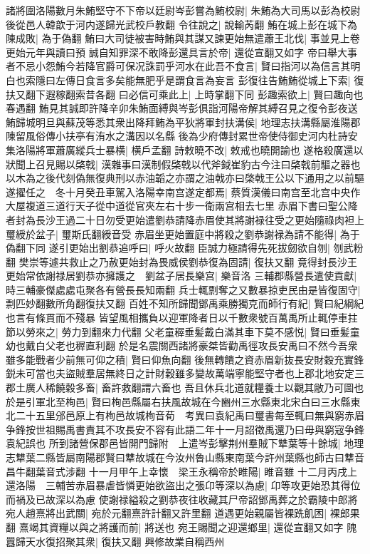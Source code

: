 諸將圍洛陽數月朱鮪堅守不下帝以廷尉岑彭嘗為鮪校尉|{
	朱鮪為大司馬以彭為校尉後從邑人韓歆于河内遂歸光武校戶教翻}
令往說之|{
	說輸芮翻}
鮪在城上彭在城下為陳成敗|{
	為于偽翻}
鮪曰大司徒被害時鮪與其謀又諫更始無遣蕭王北伐|{
	事並見上卷更始元年與讀曰預}
誠自知罪深不敢降彭還具言於帝|{
	還從宣翻又如字}
帝曰舉大事者不忌小怨鮪今若降官爵可保况誅罰乎河水在此吾不食言|{
	賢曰指河以為信言其明白也索隱曰左傳日食言多矣能無肥乎是謂食言為妄言}
彭復往告鮪鮪從城上下索|{
	復扶又翻下遐稼翻索昔各翻}
曰必信可乘此上|{
	上時掌翻下同}
彭趣索欲上|{
	賢曰趣向也春遇翻}
鮪見其誠即許降辛卯朱鮪面縛與岑彭俱詣河陽帝解其縛召見之復令彭夜送鮪歸城明旦與蘇茂等悉其衆出降拜鮪為平狄將軍封扶溝侯|{
	地理志扶溝縣屬淮陽郡陳留風俗傳小扶亭有洧水之溝因以名縣}
後為少府傳封累世帝使侍御史河内杜詩安集洛陽將軍蕭廣縱兵士暴横|{
	横戶孟翻}
詩敕曉不改|{
	敕戒也曉開諭也}
遂格殺廣還以狀聞上召見賜以棨戟|{
	漢雜事曰漢制假棨戟以代斧鉞崔豹古今注曰棨戟前驅之器也以木為之後代刻偽無復典刑以赤油韜之亦謂之油戟亦曰棨戟王公以下通用之以前驅}
遂擢任之　冬十月癸丑車駕入洛陽幸南宫遂定都焉|{
	蔡質漢儀曰南宫至北宫中央作大屋複道三道行天子從中道從官夾左右十步一衛兩宫相去七里}
赤眉下書曰聖公降者封為長沙王過二十日勿受更始遣劉恭請降赤眉使其將謝禄往受之更始隨祿肉袒上璽綬於盆子|{
	璽斯氏翻綬音受}
赤眉坐更始置庭中將殺之劉恭謝禄為請不能得|{
	為于偽翻下同}
遂引更始出劉恭追呼曰|{
	呼火故翻}
臣誠力極請得先死拔劒欲自刎|{
	刎武粉翻}
樊崇等遽共救止之乃赦更始封為畏威侯劉恭復為固請|{
	復扶又翻}
竟得封長沙王更始常依謝禄居劉恭亦擁護之　劉盆子居長樂宫|{
	樂音洛}
三輔郡縣營長遣使貢獻|{
	時三輔豪傑處處屯聚各有營長長知兩翻}
兵士輒剽奪之又數暴掠吏民由是皆復固守|{
	剽匹妙翻數所角翻復扶又翻}
百姓不知所歸聞鄧禹乘勝獨克而師行有紀|{
	賢曰紀綱紀也言有條貫而不殘暴}
皆望風相攜負以迎軍降者日以千數衆號百萬禹所止輒停車拄節以勞來之|{
	勞力到翻來力代翻}
父老童稺垂髪戴白滿其車下莫不感悦|{
	賢曰垂髪童幼也戴白父老也稺直利翻}
於是名震關西諸將豪桀皆勸禹徑攻長安禹曰不然今吾衆雖多能戰者少前無可仰之積|{
	賢曰仰魚向翻}
後無轉饋之資赤眉新抜長安財穀充實鋒鋭未可當也夫盜賊羣居無終日之計財穀雖多變故萬端寧能堅守者也上郡北地安定三郡土廣人稀饒穀多畜|{
	畜許救翻謂六畜也}
吾且休兵北道就糧養士以觀其敝乃可圖也於是引軍北至栒邑|{
	賢曰栒邑縣屬右扶風故城在今豳州三水縣東北宋白曰三水縣東北二十五里邠邑原上有栒邑故城栒音荀　考異曰袁紀禹曰璽書每至輒曰無與窮赤眉争鋒按世祖賜禹書責其不攻長安不容有此語二年十一月詔徵禹還乃曰毋與窮宼争鋒袁紀誤也}
所到諸營保郡邑皆開門歸附　上遣岑彭擊荆州羣賊下犨葉等十餘城|{
	地理志犨葉二縣皆屬南陽郡賢曰犨故城在今汝州魯山縣東南葉今許州葉縣也師古曰犨音昌牛翻葉音式涉翻}
十一月甲午上幸懷　梁王永稱帝於睢陽|{
	睢音雖}
十二月丙戌上還洛陽　三輔苦赤眉暴虐皆憐更始欲盜出之張卬等深以為慮|{
	卬等攻更始恐其得位而禍及已故深以為慮}
使謝禄縊殺之劉恭夜往收藏其尸帝詔鄧禹葬之於霸陵中郎將宛人趙熹將出武關|{
	宛於元翻熹許計翻又許里翻}
道遇更始親屬皆裸跣飢困|{
	裸郎果翻}
熹竭其資糧以與之將護而前|{
	將送也}
宛王賜聞之迎還鄉里|{
	還從宣翻又如字}
隗囂歸天水復招聚其衆|{
	復扶又翻}
興修故業自稱西州


